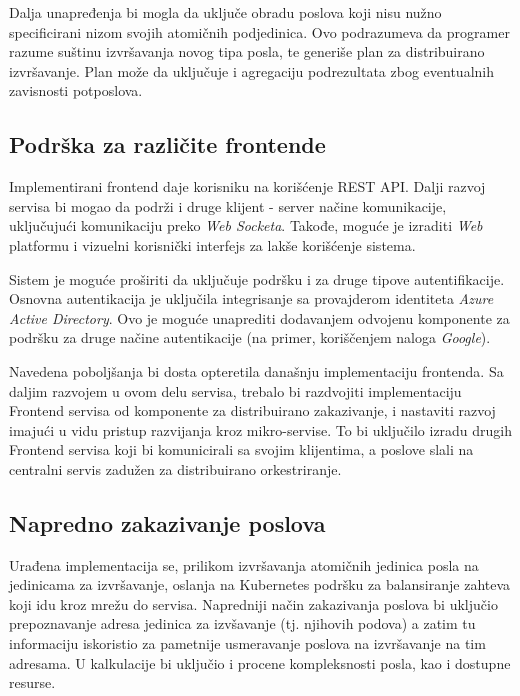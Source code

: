 \documentclass[12pt,oneside]{memoir}
\begin{document}
Dalja unapređenja bi mogla da uključe obradu poslova koji nisu nužno specificirani nizom svojih atomičnih podjedinica. Ovo podrazumeva da programer razume suštinu izvršavanja novog tipa posla, te generiše plan za distribuirano izvršavanje. Plan može da uključuje i agregaciju podrezultata zbog eventualnih zavisnosti potposlova.


\subsection{Podrška za različite frontende}

Implementirani frontend daje korisniku na korišćenje REST API. Dalji razvoj servisa bi mogao da podrži i druge klijent - server načine komunikacije, uključujući komunikaciju preko \emph{Web Socketa}. Takođe, moguće je izraditi \emph{Web} platformu i vizuelni korisnički interfejs za lakše korišćenje sistema.

Sistem je moguće proširiti da uključuje podršku i za druge tipove autentifikacije. Osnovna autentikacija je uključila integrisanje sa provajderom identiteta \emph{Azure Active Directory}. Ovo je moguće unaprediti dodavanjem odvojenu komponente za podršku za druge načine autentikacije (na primer, koriščenjem naloga \emph{Google}).

Navedena poboljšanja bi dosta opteretila današnju implementaciju frontenda. Sa daljim razvojem u ovom delu servisa, trebalo bi razdvojiti implementaciju Frontend servisa od komponente za distribuirano zakazivanje, i nastaviti razvoj imajući u vidu pristup razvijanja kroz mikro-servise. To bi uključilo izradu drugih Frontend servisa koji bi komunicirali sa svojim klijentima, a poslove slali na centralni servis zadužen za distribuirano orkestriranje.

\subsection{Napredno zakazivanje poslova}

Urađena implementacija se, prilikom izvršavanja atomičnih jedinica posla na jedinicama za izvršavanje, oslanja na Kubernetes podršku za balansiranje zahteva koji idu kroz mrežu do servisa. Napredniji način zakazivanja poslova bi uključio prepoznavanje adresa jedinica za izvšavanje (tj. njihovih podova) a zatim tu informaciju iskoristio za pametnije usmeravanje poslova na izvršavanje na tim adresama. U kalkulacije bi uključio i procene kompleksnosti posla, kao i dostupne resurse.
\end{document}
